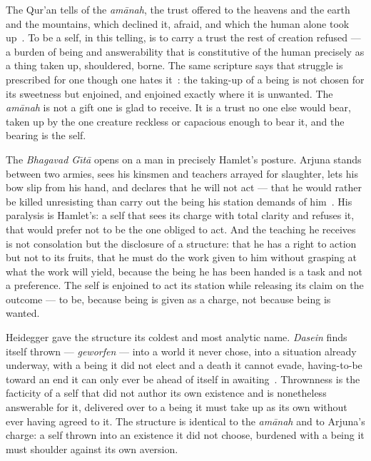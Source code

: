 \documentclass[11pt]{article}
\begin{document}
The Qur'an tells of the \emph{am\=anah}, the trust offered to the heavens and the earth and the mountains, which declined it, afraid, and which the human alone took up~\cite{quran3372}. To be a self, in this telling, is to carry a trust the rest of creation refused --- a burden of being and answerability that is constitutive of the human precisely as a thing taken up, shouldered, borne. The same scripture says that struggle is prescribed for one though one hates it~\cite{quran2216}: the taking-up of a being is not chosen for its sweetness but enjoined, and enjoined exactly where it is unwanted. The \emph{am\=anah} is not a gift one is glad to receive. It is a trust no one else would bear, taken up by the one creature reckless or capacious enough to bear it, and the bearing is the self.

The \emph{Bhagavad G\=\i t\=a} opens on a man in precisely Hamlet's posture. Arjuna stands between two armies, sees his kinsmen and teachers arrayed for slaughter, lets his bow slip from his hand, and declares that he will not act --- that he would rather be killed unresisting than carry out the being his station demands of him~\cite{gita}. His paralysis is Hamlet's: a self that sees its charge with total clarity and refuses it, that would prefer not to be the one obliged to act. And the teaching he receives is not consolation but the disclosure of a structure: that he has a right to action but not to its fruits, that he must do the work given to him without grasping at what the work will yield, because the being he has been handed is a task and not a preference. The self is enjoined to act its station while releasing its claim on the outcome --- to be, because being is given as a charge, not because being is wanted.

Heidegger gave the structure its coldest and most analytic name. \emph{Dasein} finds itself thrown --- \emph{geworfen} --- into a world it never chose, into a situation already underway, with a being it did not elect and a death it cannot evade, having-to-be toward an end it can only ever be ahead of itself in awaiting~\cite{heidegger1962}. Thrownness is the facticity of a self that did not author its own existence and is nonetheless answerable for it, delivered over to a being it must take up as its own without ever having agreed to it. The structure is identical to the \emph{am\=anah} and to Arjuna's charge: a self thrown into an existence it did not choose, burdened with a being it must shoulder against its own aversion.
\end{document}
